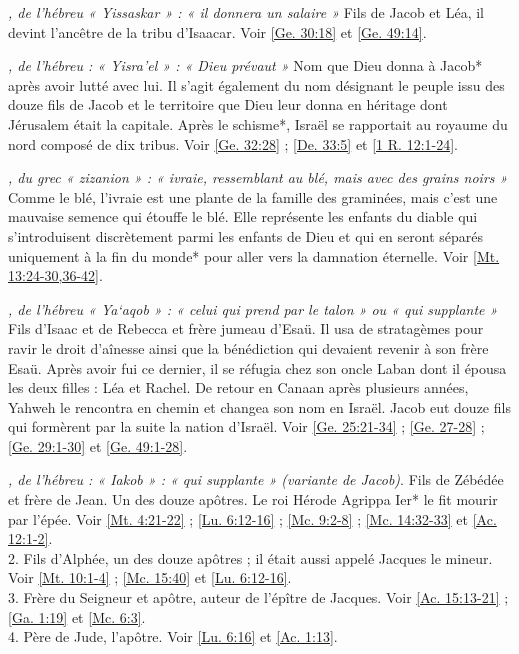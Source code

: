 \begin{multicols}{2}
\textit{, de l'hébreu « Yissaskar » : « il donnera un salaire »}\newline
Fils de Jacob et Léa, il devint l'ancêtre de la tribu d'Isaacar. Voir \vref{Ge. 30:18} et \vref{Ge. 49:14}.

\textit{, de l'hébreu : « Yisra'el » : « Dieu prévaut »}\newline
Nom que Dieu donna à Jacob* après avoir lutté avec lui. Il s'agit également du nom désignant le peuple issu des douze fils de Jacob et le territoire que Dieu leur donna en héritage dont Jérusalem était la capitale. Après le schisme*, Israël se rapportait au royaume du nord composé de dix tribus. Voir \vref{Ge. 32:28} ; \vref{De. 33:5} et \vref{1 R. 12:1-24}.

\textit{, du grec « zizanion » : « ivraie, ressemblant au blé, mais avec des grains noirs »}\newline
Comme le blé, l'ivraie est une plante de la famille des graminées, mais c'est une mauvaise semence qui étouffe le blé. Elle représente les enfants du diable qui s'introduisent discrètement parmi les enfants de Dieu et qui en seront séparés uniquement à la fin du monde* pour aller vers la damnation éternelle. Voir \vref{Mt. 13:24-30,36-42}.

\textit{, de l'hébreu « Ya`aqob » : « celui qui prend par le talon » ou « qui supplante »}\newline
Fils d'Isaac et de Rebecca et frère jumeau d'Esaü. Il usa de stratagèmes pour ravir le droit d'aînesse ainsi que la bénédiction qui devaient revenir à son frère Esaü. Après avoir fui ce dernier, il se réfugia chez son oncle Laban dont il épousa les deux filles : Léa et Rachel. De retour en Canaan après plusieurs années, Yahweh le rencontra en chemin et changea son nom en Israël. Jacob eut douze fils qui formèrent par la suite la nation d'Israël. Voir \vref{Ge. 25:21-34} ; \vref{Ge. 27-28} ; \vref{Ge. 29:1-30} et \vref{Ge. 49:1-28}.

\textit{, de l'hébreu : « Iakob » : « qui supplante » (variante de Jacob)}. Fils de Zébédée et frère de Jean. Un des douze apôtres. Le roi Hérode Agrippa Ier* le fit mourir par l'épée. Voir \vref{Mt. 4:21-22} ; \vref{Lu. 6:12-16} ; \vref{Mc. 9:2-8} ; \vref{Mc. 14:32-33} et \vref{Ac. 12:1-2}.
\\2. Fils d'Alphée, un des douze apôtres ; il était aussi appelé Jacques le mineur. Voir \vref{Mt. 10:1-4} ; \vref{Mc. 15:40} et \vref{Lu. 6:12-16}.
\\3. Frère du Seigneur et apôtre, auteur de l'épître de Jacques. Voir \vref{Ac. 15:13-21} ; \vref{Ga. 1:19} et \vref{Mc. 6:3}.
\\4. Père de Jude, l'apôtre. Voir \vref{Lu. 6:16} et \vref{Ac. 1:13}.


\end{multicols}
